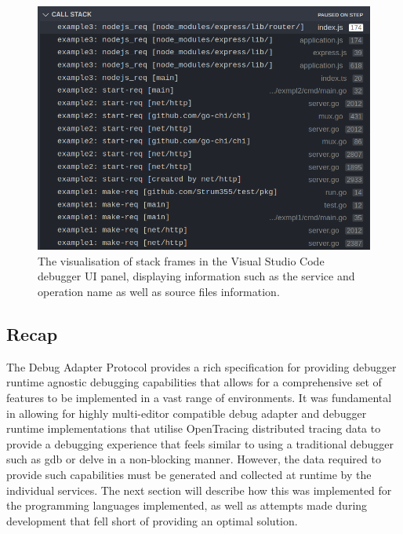 \documentclass[12pt,pdftex,titlepage]{report}
\begin{document}
            \bigskip
            \begin{figure}[htb!]
                \centering
                \includegraphics[scale=1.6]{vscodestack.png}
                \caption[Visual Studio Code debugger UI - Stack Frame view]{The visualisation of stack frames in the Visual Studio Code debugger UI panel, displaying information such as the service and operation name as well as source files information.}
                \label{fig:stacks}
            \end{figure}

            \newpage
            \subsection{Recap}
                The Debug Adapter Protocol provides a rich specification for providing debugger runtime agnostic debugging capabilities that allows for a comprehensive set of features to be implemented in a vast range of environments.
                It was fundamental in allowing for highly multi-editor compatible debug adapter and debugger runtime implementations that utilise OpenTracing distributed tracing data to provide a debugging experience that feels similar
                to using a traditional debugger such as gdb or delve in a non-blocking manner. However, the data required to provide such capabilities must be generated and collected at runtime by the individual services. The next section
                will describe how this was implemented for the programming languages implemented, as well as attempts made during development that fell short of providing an optimal solution.
\end{document}
